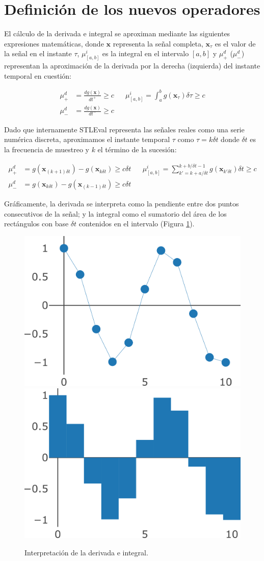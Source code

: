 \section{Definición de los nuevos operadores}

El cálculo de la derivada e integral se aproximan mediante las siguientes expresiones matemáticas, donde $\mathbf{x}$ representa la señal completa, $\mathbf{x}_{\tau}$ es el valor de la señal en el instante $\tau$, $\mu^i_{[a,b]}$ es la integral en el intervalo $[a, b]$ y $\mu^d_{+}$ ($\mu^d_{-}$) representan la aproximación de la derivada por la derecha (izquierda) del instante temporal en cuestión:

\begin{align*}
\mu^d_{+} &= \frac{dg(\mathbf{x})}{dt^+} \geq c & & \mu^i_{[a,b]} = \int^{b}_{a} g(\mathbf{x}_{\tau}) \delta \tau \geq c \\
\mu^d_{-} &= \frac{dg(\mathbf{x})}{dt^-} \geq c &
\end{align*}

Dado que internamente STLEval representa las señales reales como una serie numérica discreta, aproximamos el instante temporal $\tau$ como $\tau = k \delta t$ donde $\delta t$ es la frecuencia de muestreo y $k$ el término de la sucesión:

\begin{align*}
\mu^d_{+} &= g(\mathbf{x}_{(k + 1) \delta t}) - g(\mathbf{x}_{k \delta t}) \geq c \delta t & & \mu^i_{[a,b]} = \sum^{k + b / \delta t - 1}_{k' = k + a / \delta t} g(\mathbf{x}_{k' \delta t}) \delta t \geq c \\
\mu^d_{-} &= g(\mathbf{x}_{k \delta t}) - g(\mathbf{x}_{(k - 1) \delta t}) \geq c \delta t & 
\end{align*}

Gráficamente, la derivada se interpreta como la pendiente entre dos puntos consecutivos de la señal; y la integral como el sumatorio del área de los rectángulos con base  $\delta t$ contenidos en el intervalo (Figura \ref{fig:der_int}). 

\begin{figure}
\centering
  \includegraphics[width=.4\linewidth]{images/derivada} \hfill
  \includegraphics[width=.4\linewidth]{images/integral}
\caption{Interpretación de la derivada e integral.}
\label{fig:der_int}
\end{figure}

